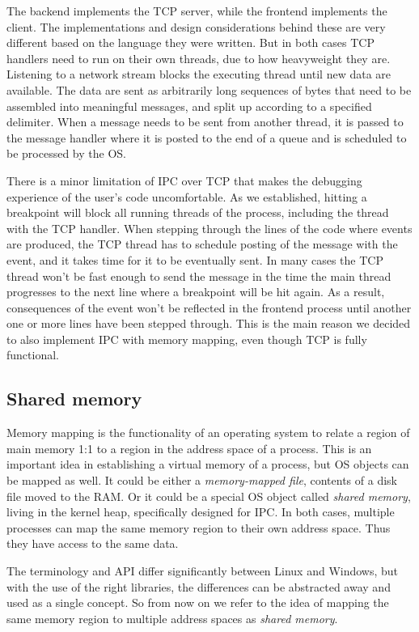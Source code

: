 The backend implements the TCP server, while the frontend implements the client. The implementations and design considerations behind these are very different based on the language they were written. But in both cases TCP handlers need to run on their own threads, due to how heavyweight they are. Listening to a network stream blocks the executing thread until new data are available. The data are sent as arbitrarily long sequences of bytes that need to be assembled into meaningful messages, and split up according to a specified delimiter. When a message needs to be sent from another thread, it is passed to the message handler where it is posted to the end of a queue and is scheduled to be processed by the OS.

There is a minor limitation of IPC over TCP that makes the debugging experience of the user's code uncomfortable. As we established, hitting a breakpoint will block all running threads of the process, including the thread with the TCP handler. When stepping through the lines of the code where events are produced, the TCP thread has to schedule posting of the message with the event, and it takes time for it to be eventually sent. In many cases the TCP thread won't be fast enough to send the message in the time the main thread progresses to the next line where a breakpoint will be hit again. As a result, consequences of the event won't be reflected in the frontend process until another one or more lines have been stepped through. This is the main reason we decided to also implement IPC with memory mapping, even though TCP is fully functional.

\subsection{Shared memory} \label{subsec:ipc_shmem}

Memory mapping is the functionality of an operating system to relate a region of main memory 1:1 to a region in the address space of a process. This is an important idea in establishing a virtual memory of a process, but OS objects can be mapped as well. It could be either a \textit{memory-mapped file}, contents of a disk file moved to the RAM. Or it could be a special OS object called \textit{shared memory}, living in the kernel heap, specifically designed for IPC. In both cases, multiple processes can map the same memory region to their own address space. Thus they have access to the same data.

The terminology and API differ significantly between Linux and Windows, but with the use of the right libraries, the differences can be abstracted away and used as a single concept. So from now on we refer to the idea of mapping the same memory region to multiple address spaces as \textit{shared memory}.

